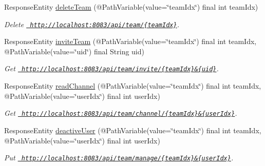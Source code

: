 \begin{DoxyCompactItemize}
Response\+Entity \mbox{\hyperlink{classcom_1_1aomc_1_1coop_1_1controller_1_1_team_controller_ad91980399a0c2439032d93aaa5131077}{delete\+Team}} (@Path\+Variable(value=\char`\"{}team\+Idx\char`\"{}) final int team\+Idx)
\begin{DoxyCompactList}\small\item\em Delete \href{http://localhost:8083/api/team/{teamIdx}}{\texttt{ http\+://localhost\+:8083/api/team/\{team\+Idx\}}}. \end{DoxyCompactList}\item 
Response\+Entity \mbox{\hyperlink{classcom_1_1aomc_1_1coop_1_1controller_1_1_team_controller_af2a1d085dd55682cfeb5c9932436270f}{invite\+Team}} (@Path\+Variable(value=\char`\"{}team\+Idx\char`\"{}) final int team\+Idx, @Path\+Variable(value=\char`\"{}uid\char`\"{}) final String uid)
\begin{DoxyCompactList}\small\item\em Get \href{http://localhost:8083/api/team/invite/{teamIdx}&{uid}}{\texttt{ http\+://localhost\+:8083/api/team/invite/\{team\+Idx\}\&\{uid\}}}. \end{DoxyCompactList}\item 
Response\+Entity \mbox{\hyperlink{classcom_1_1aomc_1_1coop_1_1controller_1_1_team_controller_a890d22a6a53400482037c0587483b67d}{read\+Channel}} (@Path\+Variable(value=\char`\"{}team\+Idx\char`\"{}) final int team\+Idx, @Path\+Variable(value=\char`\"{}user\+Idx\char`\"{}) final int user\+Idx)
\begin{DoxyCompactList}\small\item\em Get \href{http://localhost:8083/api/team/channel/{teamIdx}&{userIdx}}{\texttt{ http\+://localhost\+:8083/api/team/channel/\{team\+Idx\}\&\{user\+Idx\}}}. \end{DoxyCompactList}\item 
Response\+Entity \mbox{\hyperlink{classcom_1_1aomc_1_1coop_1_1controller_1_1_team_controller_a0458b6213d34ba925524eaf1471961fd}{deactive\+User}} (@Path\+Variable(value=\char`\"{}team\+Idx\char`\"{}) final int team\+Idx, @Path\+Variable(value=\char`\"{}user\+Idx\char`\"{}) final int user\+Idx)
\begin{DoxyCompactList}\small\item\em Put \href{http://localhost:8083/api/team/manage/{teamIdx}&{userIdx}}{\texttt{ http\+://localhost\+:8083/api/team/manage/\{team\+Idx\}\&\{user\+Idx\}}}. \end{DoxyCompactList}\end{DoxyCompactItemize}


